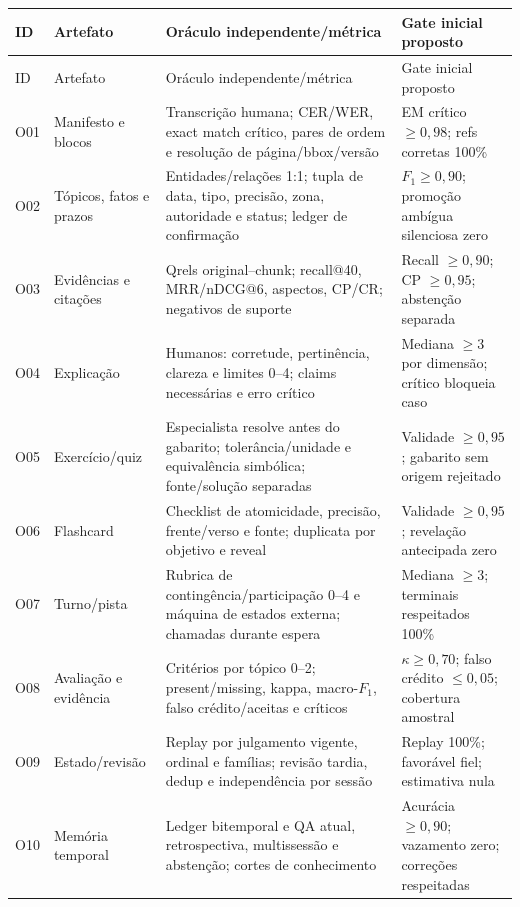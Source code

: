 \documentclass[12pt]{article}
\begin{document}
\begin{center}\small
\begin{longtable}{@{}L{0.8cm}L{3.0cm}L{6.3cm}L{4.7cm}@{}}
\toprule ID & Artefato & Oráculo independente/métrica & Gate inicial proposto \\ \midrule
\endfirsthead
\toprule ID & Artefato & Oráculo independente/métrica & Gate inicial proposto \\ \midrule
\endhead
O01 & Manifesto e blocos & Transcrição humana; CER/WER, exact match crítico, pares de ordem e resolução de página/bbox/versão & EM crítico $\geq0{,}98$; refs corretas 100\% \\
O02 & Tópicos, fatos e prazos & Entidades/relações 1:1; tupla de data, tipo, precisão, zona, autoridade e status; ledger de confirmação & $F_1\geq0{,}90$; promoção ambígua silenciosa zero \\
O03 & Evidências e citações & Qrels original--chunk; recall@40, MRR/nDCG@6, aspectos, CP/CR; negativos de suporte & Recall $\geq0{,}90$; CP $\geq0{,}95$; abstenção separada \\
O04 & Explicação & Humanos: corretude, pertinência, clareza e limites 0--4; claims necessárias e erro crítico & Mediana $\geq3$ por dimensão; crítico bloqueia caso \\
O05 & Exercício/quiz & Especialista resolve antes do gabarito; tolerância/unidade e equivalência simbólica; fonte/solução separadas & Validade $\geq0{,}95$; gabarito sem origem rejeitado \\
O06 & Flashcard & Checklist de atomicidade, precisão, frente/verso e fonte; duplicata por objetivo e reveal & Validade $\geq0{,}95$; revelação antecipada zero \\
O07 & Turno/pista & Rubrica de contingência/participação 0--4 e máquina de estados externa; chamadas durante espera & Mediana $\geq3$; terminais respeitados 100\% \\
O08 & Avaliação e evidência & Critérios por tópico 0--2; present/missing, kappa, macro-$F_1$, falso crédito/aceitas e críticos & $\kappa\geq0{,}70$; falso crédito $\leq0{,}05$; cobertura amostral \\
O09 & Estado/revisão & Replay por julgamento vigente, ordinal e famílias; revisão tardia, dedup e independência por sessão & Replay 100\%; favorável fiel; estimativa nula \\
O10 & Memória temporal & Ledger bitemporal e QA atual, retrospectiva, multissessão e abstenção; cortes de conhecimento & Acurácia $\geq0{,}90$; vazamento zero; correções respeitadas \\

\end{longtable}
\end{center}
\end{document}
